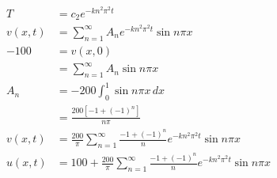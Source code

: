 \documentclass{article}
\begin{document}
\begin{align*}
  T                & = c_2 e^{-k n^2 \pi^2 t}                                                                          \\
  v(x, t)          & = \sum_{n = 1}^\infty A_n e^{-k n^2 \pi^2 t} \sin n \pi x                                         \\
  -100             & = v(x, 0)                                                                                         \\
                   & = \sum_{n = 1}^\infty A_n \sin n \pi x                                                            \\
  A_n              & = -200 \int_0^1 \sin n \pi x \,d x                                                                \\
                   & = \frac{200 [-1 + (-1)^n]}{n \pi}                                                                 \\
  v(x, t)          & = \frac{200}{\pi} \sum_{n = 1}^\infty \frac{-1 + (-1)^n}{n} e^{-k n^2 \pi^2 t} \sin n \pi x       \\
  u(x, t)          & = 100 + \frac{200}{\pi} \sum_{n = 1}^\infty \frac{-1 + (-1)^n}{n} e^{-k n^2 \pi^2 t} \sin n \pi x
\end{align*}

\setcounter{subsubsection}{2}
\subsubsection{}
\end{document}
